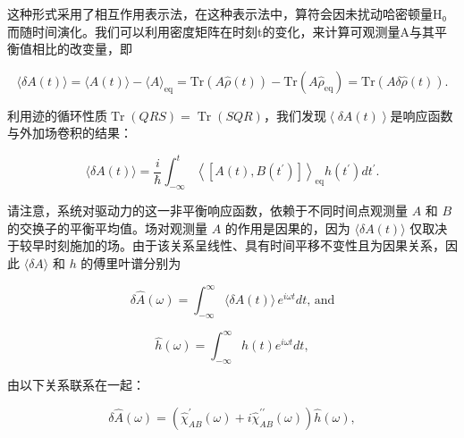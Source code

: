 这种形式采用了相互作用表示法，在这种表示法中，算符会因未扰动哈密顿量H₀而随时间演化。我们可以利用密度矩阵在时刻t的变化，来计算可观测量A与其平衡值相比的改变量，即

\begin{equation}\tag{15.6.7}\label{eq:15.6.7}
\langle \delta A ( t ) \rangle = \langle A ( t ) \rangle - \langle A \rangle _ { \mathrm { e q } } = \mathrm { T r } \left( A \hat { \rho } ( t ) \right) - \mathrm { T r } \left( A \hat { \rho } _ { \mathrm { e q } } \right) = \mathrm { T r } \left( A \delta \hat { \rho } ( t ) \right) .
\end{equation}

利用迹的循环性质\(\operatorname{Tr}\left(QRS\right)=\operatorname{Tr}\left(SQR\right)\)，我们发现\(\left\langle\delta A(t)\right\rangle\)是响应函数与外加场卷积的结果：

\begin{equation}\tag{15.6.8}\label{eq:15.6.8}
\langle \delta A ( t ) \rangle = \frac { i } { \hbar } \int _ { - \infty } ^{t} \left\langle \left[ A ( t ) , B ( t ^{\prime} ) \right] \right\rangle _ { \mathrm { e q } } h ( t ^{\prime} ) d t ^{\prime} .
\end{equation}

请注意，系统对驱动力的这一非平衡响应函数，依赖于不同时间点观测量 \(A\) 和 \(B\) 的交换子的平衡平均值。场对观测量 \(A\) 的作用是因果的，因为 \(\langle\delta A(t)\rangle\) 仅取决于较早时刻施加的场。由于该关系呈线性、具有时间平移不变性且为因果关系，因此 \(\langle\delta A\rangle\) 和 \(h\) 的傅里叶谱分别为

\begin{equation}\tag{15.6.9}\label{eq:15.6.9}
\delta \hat { A } ( \omega ) = \int _ { - \infty } ^{\infty} \langle \delta A ( t ) \rangle \, e ^{i \omega t} d t , \, \mathrm { a n d }
\end{equation}

\begin{equation}\tag{15.6.10}\label{eq:15.6.10}
\hat { h } ( \omega ) = \int _ { - \infty } ^{\infty} h ( t ) e ^{i \omega t} d t ,
\end{equation}

由以下关系联系在一起：

\begin{equation}\tag{15.6.11}\label{eq:15.6.11}
\delta \hat { A } ( \omega ) = \left( \hat { \chi } _ { A B } ^{\prime} ( \omega ) + i \hat { \chi } _ { A B } ^{\prime \prime} ( \omega ) \right) \hat { h } ( \omega ) ,
\end{equation}

